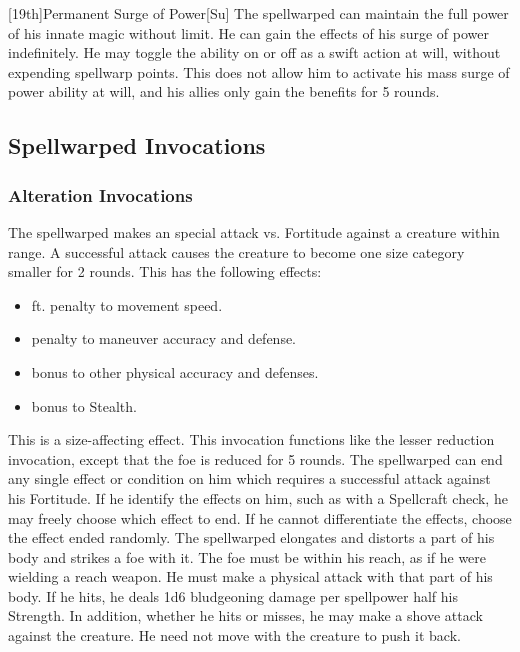 [19th]{Permanent Surge of Power}[Su]
The spellwarped can maintain the full power of his innate magic without limit.
He can gain the effects of his surge of power indefinitely.
He may toggle the ability on or off as a swift action at will, without expending spellwarp points.
This does not allow him to activate his mass surge of power ability at will, and his allies only gain the benefits for 5 rounds.

\subsection{Spellwarped Invocations}\label{Spellwarped Invocations}

\subsubsection{Alteration Invocations}
The spellwarped makes an special attack vs. Fortitude against a creature within \rngclose range.
A successful attack causes the creature to become one size category smaller for 2 rounds.
This has the following effects:
\begin{itemize}
    \item {} ft. penalty to movement speed.
    \item {} penalty to maneuver accuracy and defense.
    \item {} bonus to other physical accuracy and defenses.
    \item {} bonus to Stealth.
\end{itemize}
This is a size-affecting effect.
This invocation functions like the lesser reduction invocation, except that the foe is reduced for 5 rounds.
The spellwarped can end any single effect or condition on him which requires a successful attack against his Fortitude.
If he identify the effects on him, such as with a Spellcraft check, he may freely choose which effect to end.
If he cannot differentiate the effects, choose the effect ended randomly.
The spellwarped elongates and distorts a part of his body and strikes a foe with it.
The foe must be within his reach, as if he were wielding a reach weapon.
He must make a physical attack with that part of his body.
If he hits, he deals 1d6 bludgeoning damage per spellpower \add half his Strength.
In addition, whether he hits or misses, he may make a shove attack against the creature.
He need not move with the creature to push it back.
